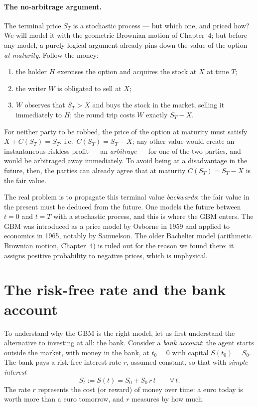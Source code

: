 \paragraph*{The no-arbitrage argument.}

The terminal price $S_T$ is a stochastic process --- but which one, and priced how?
We will model it with the geometric Brownian motion of Chapter~4; but before any model, a purely logical argument already pins down the value of the option \emph{at maturity}.
Follow the money:
\begin{enumerate}
    \item the holder $H$ exercises the option and acquires the stock at $X$ at time $T$;
    \item the writer $W$ is obligated to sell at $X$;
    \item $W$ observes that $S_T > X$ and buys the stock in the market, selling it immediately to $H$; the round trip costs $W$ exactly $S_T - X$.
\end{enumerate}
For neither party to be robbed, the price of the option at maturity must satisfy $X + C(S_T) = S_T$, i.e.\ $C(S_T)=S_T-X$; any other value would create an instantaneous riskless profit --- an \emph{arbitrage} --- for one of the two parties, and would be arbitraged away immediately.
To avoid being at a disadvantage in the future, then, the parties can already agree that at maturity $C(S_T) = S_T - X$ is the fair value.

The real problem is to propagate this terminal value \emph{backwards}: the fair value in the present must be deduced from the future.
One models the future between $t=0$ and $t=T$ with a stochastic process, and this is where the GBM enters.
The GBM was introduced as a price model by Osborne in 1959\cite{Osborne1959} and applied to economics in 1965, notably by Samuelson\cite{Samuelson1965}.
The older Bachelier model (arithmetic Brownian motion, Chapter~4) is ruled out for the reason we found there: it assigns positive probability to negative prices, which is unphysical.


\section{The risk-free rate and the bank account}\label{sec:bank-account}

To understand why the GBM is the right model, let us first understand the alternative to investing at all: the bank.
Consider a \emph{bank account}: the agent starts outside the market, with money in the bank, at $t_0 = 0$ with capital $S(t_0)=S_0$.
The bank pays a risk-free interest rate $r$, assumed constant, so that with \emph{simple interest}
\begin{equation}
S_t := S(t) = S_0 + S_0\, r\, t \qquad \forall\, t.
\end{equation}
The rate $r$ represents the cost (or reward) of money over time: a euro today is worth more than a euro tomorrow, and $r$ measures by how much.

